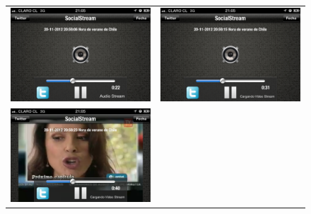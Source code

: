 \begin{figure}[H]
	\centering
	\begin{tabular}{cc}
	\includegraphics[scale=0.21]{imgs/cell-link-1.png} & 
	\includegraphics[scale=0.21]{imgs/cell-link-2.png} \\
	\includegraphics[scale=0.21]{imgs/cell-link-3.png} & 

\end{tabular}
\end{figure}
